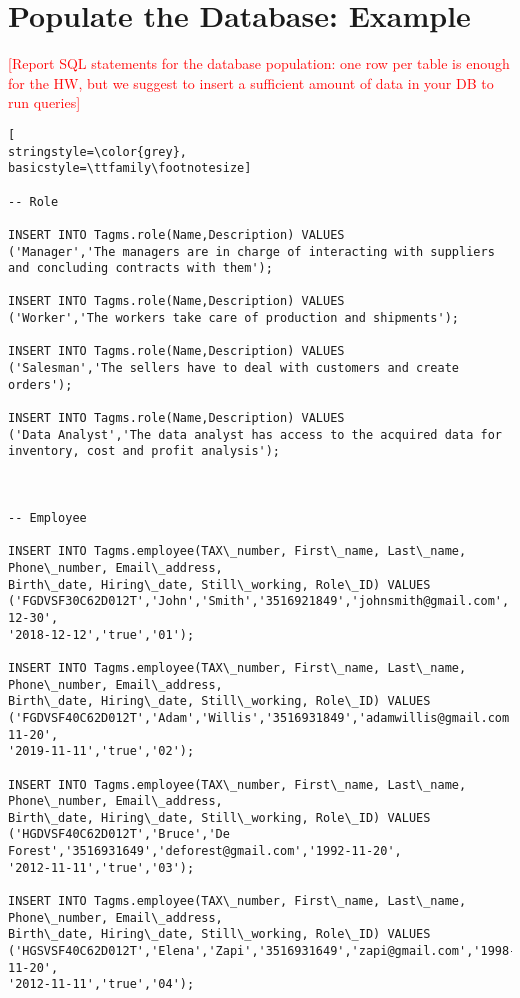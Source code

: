 
\section{Populate the Database: Example}
\textcolor{red}{[Report SQL statements for the database population: one row per table is enough for the HW, but we suggest to insert a sufficient amount of data in your DB to run queries]}


\begin{lstlisting}[
stringstyle=\color{grey},
basicstyle=\ttfamily\footnotesize]

-- Role

INSERT INTO Tagms.role(Name,Description) VALUES 
('Manager','The managers are in charge of interacting with suppliers and concluding contracts with them');

INSERT INTO Tagms.role(Name,Description) VALUES 
('Worker','The workers take care of production and shipments');

INSERT INTO Tagms.role(Name,Description) VALUES 
('Salesman','The sellers have to deal with customers and create orders');

INSERT INTO Tagms.role(Name,Description) VALUES 
('Data Analyst','The data analyst has access to the acquired data for inventory, cost and profit analysis');



-- Employee

INSERT INTO Tagms.employee(TAX\_number, First\_name, Last\_name, Phone\_number, Email\_address,
Birth\_date, Hiring\_date, Still\_working, Role\_ID) VALUES
('FGDVSF30C62D012T','John','Smith','3516921849','johnsmith@gmail.com','1995-12-30',
'2018-12-12','true','01');

INSERT INTO Tagms.employee(TAX\_number, First\_name, Last\_name, Phone\_number, Email\_address,
Birth\_date, Hiring\_date, Still\_working, Role\_ID) VALUES
('FGDVSF40C62D012T','Adam','Willis','3516931849','adamwillis@gmail.com','1993-11-20',
'2019-11-11','true','02');

INSERT INTO Tagms.employee(TAX\_number, First\_name, Last\_name, Phone\_number, Email\_address,
Birth\_date, Hiring\_date, Still\_working, Role\_ID) VALUES
('HGDVSF40C62D012T','Bruce','De Forest','3516931649','deforest@gmail.com','1992-11-20',
'2012-11-11','true','03');

INSERT INTO Tagms.employee(TAX\_number, First\_name, Last\_name, Phone\_number, Email\_address,
Birth\_date, Hiring\_date, Still\_working, Role\_ID) VALUES
('HGSVSF40C62D012T','Elena','Zapi','3516931649','zapi@gmail.com','1998-11-20',
'2012-11-11','true','04');


\end{lstlisting}
